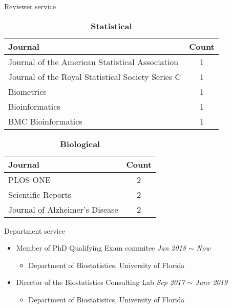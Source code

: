\documentclass{resume} %
\begin{document}
\begin{rSection}{Reviewer service}

\begin{table}[htp]
\caption*{\textbf{Statistical}}
\begin{center}
\begin{tabular}{l c }
\hline
\hline
Journal & Count \\
\hline
Journal of the American Statistical Association & 1 \\
Journal of the Royal Statistical Society Series C & 1 \\
Biometrics & 1 \\
Bioinformatics & 1 \\
BMC Bioinformatics & 1 \\
\hline
\hline
\end{tabular}
\end{center}
\label{default}
\end{table}%

\begin{table}[htp]
\caption*{\textbf{Biological}}
\begin{center}
\begin{tabular}{l c }
\hline
\hline
Journal & Count \\
\hline
PLOS ONE & 2 \\
Scientific Reports & 2 \\
Journal of Alzheimer's Disease & 2 \\
\hline
\hline
\end{tabular}
\end{center}
\label{default}
\end{table}%


\end{rSection}

\begin{rSection}{Department service}
\begin{itemize}[noitemsep,topsep=0pt]

\item Member of PhD Qualifying Exam commitee 
        \hfill {\em Jan 2018 $\sim$ Now} 
        \begin{itemize}
        \item Department of Biostatistics, University of Florida
        \end{itemize}

\item Director of the Biostatistics Consulting Lab
        \hfill {\em Sep 2017 $\sim$ June 2019} 
        \begin{itemize}
        \item Department of Biostatistics, University of Florida
        \end{itemize}


\end{itemize}
\end{rSection}
\end{document}

